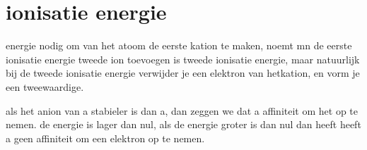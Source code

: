 \documentclass{report}
\begin{document}
\section{ionisatie energie}
energie nodig om van het atoom de eerste kation te maken, noemt mn de eerste ionisatie energie
tweede ion toevoegen is tweede ionisatie energie, maar natuurlijk bij de tweede ionisatie energie verwijder je een elektron van hetkation, en vorm je een tweewaardige.


als het anion van a stabieler is dan a, dan zeggen we dat a affiniteit om het op te nemen.
de energie is lager dan nul, als de energie groter is dan nul dan heeft heeft a geen affiniteit om een elektron op te nemen.
\end{document}
